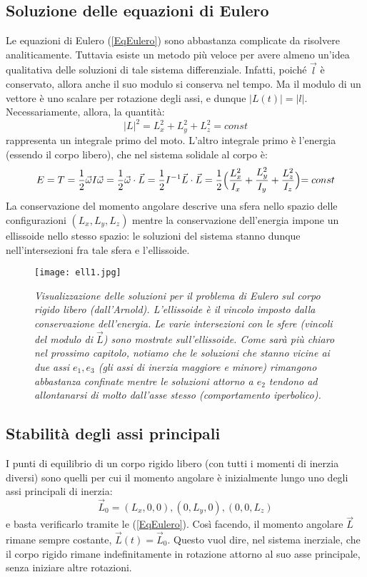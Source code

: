 \documentclass[a4paper,openany]{article}
\begin{document}
	\subsection{Soluzione delle equazioni di Eulero}
	Le equazioni di Eulero (\ref{EqEulero}) sono abbastanza complicate da risolvere analiticamente. Tuttavia esiste un metodo più veloce per avere almeno un'idea qualitativa delle soluzioni di tale sistema differenziale. Infatti, poiché $\vec{l}$ è conservato, allora anche il suo modulo si conserva nel tempo. Ma il modulo di un vettore è uno scalare per rotazione degli assi, e dunque $|L(t)| = |l|$. Necessariamente, allora, la quantità:
	$$
	|L|^{2} = L_x^2 + L_y^2 +L_z^2 = const
	$$
	rappresenta un integrale primo del moto. L'altro integrale primo è l'energia (essendo il corpo libero), che nel sistema solidale al corpo è:
	$$
	E = T = \dfrac{1}{2}\vec{\omega}I\vec{\omega} = \dfrac{1}{2}\vec{\omega}\cdot\vec{L} = \dfrac{1}{2}I^{-1}\vec{L}\cdot\vec{L} =  \dfrac{1}{2}\Bigl(\dfrac{L_x^2}{I_x} +\dfrac{L_y^2}{I_y}+\dfrac{L_z^2}{I_z}\Bigl) = const
	$$
	La conservazione del momento angolare descrive una sfera nello spazio delle configurazioni $(L_x,L_y,L_z)$ mentre la conservazione dell'energia impone un ellissoide nello stesso spazio: le soluzioni del sistema stanno dunque nell'intersezioni fra tale sfera e l'ellissoide.
	\begin{figure}[H]
		\centering
		\texttt{[image: ell1.jpg]}
		\caption{\textit{Visualizzazione delle soluzioni per il problema di Eulero sul corpo rigido libero (dall'Arnold). L'ellissoide è il vincolo imposto dalla conservazione dell'energia. Le varie intersezioni con le sfere (vincoli del modulo di $\vec{L}$) sono mostrate sull'ellissoide. Come sarà più chiaro nel prossimo capitolo, notiamo che le soluzioni che stanno vicine ai due assi $e_1, e_3$ (gli assi di inerzia maggiore e minore) rimangono abbastanza confinate mentre le soluzioni attorno a $e_2$ tendono ad allontanarsi di molto dall'asse stesso (comportamento iperbolico).}}
	\end{figure}
	\subsection{Stabilità degli assi principali}
	I punti di equilibrio di un corpo rigido libero (con tutti i momenti di inerzia diversi) sono quelli per cui il momento angolare è inizialmente lungo uno degli assi principali di inerzia:
	$$
	\vec{L}_0 = (L_x,0,0), (0,L_y,0), (0,0,L_z)
	$$
	e basta verificarlo tramite le (\ref{EqEulero}). Così facendo, il momento angolare $\vec{L}$ rimane sempre costante, $\vec{L}(t) = \vec{L}_0$. Questo vuol dire, nel sistema inerziale, che il corpo rigido rimane indefinitamente in rotazione attorno al suo asse principale, senza iniziare altre rotazioni.
	
\end{document}
